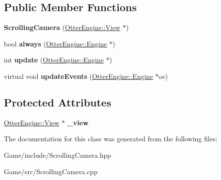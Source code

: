 \subsection*{Public Member Functions}
\begin{DoxyCompactItemize}
\item 
{\bfseries Scrolling\+Camera} (\hyperlink{class_otter_engine_1_1_view}{Otter\+Engine\+::\+View} $\ast$)\hypertarget{class_scrolling_camera_a52503f7675693c89e1af27832a343f2e}{}\label{class_scrolling_camera_a52503f7675693c89e1af27832a343f2e}

\item 
bool {\bfseries always} (\hyperlink{class_otter_engine_1_1_engine}{Otter\+Engine\+::\+Engine} $\ast$)\hypertarget{class_scrolling_camera_ad8efc0c84f743629e8905c10fc1dc884}{}\label{class_scrolling_camera_ad8efc0c84f743629e8905c10fc1dc884}

\item 
int {\bfseries update} (\hyperlink{class_otter_engine_1_1_engine}{Otter\+Engine\+::\+Engine} $\ast$)\hypertarget{class_scrolling_camera_adc10e670ba194433d8d39037e6dfe79d}{}\label{class_scrolling_camera_adc10e670ba194433d8d39037e6dfe79d}

\item 
virtual void {\bfseries update\+Events} (\hyperlink{class_otter_engine_1_1_engine}{Otter\+Engine\+::\+Engine} $\ast$oe)\hypertarget{class_scrolling_camera_af6bfa694dd7f5f8649e5a3338656ec80}{}\label{class_scrolling_camera_af6bfa694dd7f5f8649e5a3338656ec80}

\end{DoxyCompactItemize}
\subsection*{Protected Attributes}
\begin{DoxyCompactItemize}
\item 
\hyperlink{class_otter_engine_1_1_view}{Otter\+Engine\+::\+View} $\ast$ {\bfseries \+\_\+view}\hypertarget{class_scrolling_camera_a03e159151b4d900cd9d36126065706fc}{}\label{class_scrolling_camera_a03e159151b4d900cd9d36126065706fc}

\end{DoxyCompactItemize}


The documentation for this class was generated from the following files\+:\begin{DoxyCompactItemize}
\item 
Game/include/Scrolling\+Camera.\+hpp\item 
Game/src/Scrolling\+Camera.\+cpp\end{DoxyCompactItemize}
